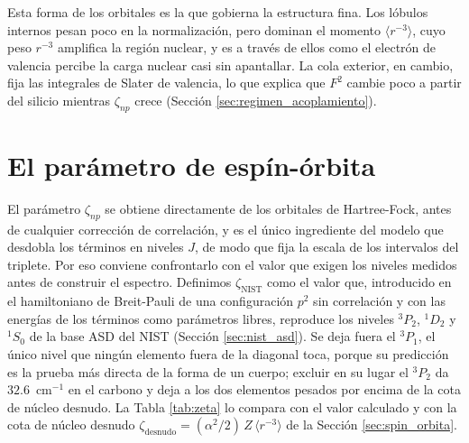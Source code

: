 Esta forma de los orbitales es la que gobierna la estructura fina. Los lóbulos internos pesan poco en la normalización, pero dominan el momento $\langle r^{-3}\rangle$, cuyo peso $r^{-3}$ amplifica la región nuclear, y es a través de ellos como el electrón de valencia percibe la carga nuclear casi sin apantallar. La cola exterior, en cambio, fija las integrales de Slater de valencia, lo que explica que $F^2$ cambie poco a partir del silicio mientras $\zeta_{np}$ crece (Sección \ref{sec:regimen_acoplamiento}).

\section{El parámetro de espín-órbita}
\label{sec:zeta_diagnostico}

El parámetro $\zeta_{np}$ se obtiene directamente de los orbitales de Hartree-Fock, antes de cualquier corrección de correlación, y es el único ingrediente del modelo que desdobla los términos en niveles $J$, de modo que fija la escala de los intervalos del triplete. Por eso conviene confrontarlo con el valor que exigen los niveles medidos antes de construir el espectro. Definimos $\zeta_{\text{NIST}}$ como el valor que, introducido en el hamiltoniano de Breit-Pauli de una configuración $p^2$ sin correlación y con las energías de los términos como parámetros libres, reproduce los niveles $^3P_2$, $^1D_2$ y $^1S_0$ de la base ASD del NIST (Sección \ref{sec:nist_asd}). Se deja fuera el $^3P_1$, el único nivel que ningún elemento fuera de la diagonal toca, porque su predicción es la prueba más directa de la forma de un cuerpo; excluir en su lugar el $^3P_2$ da $32.6$~cm$^{-1}$ en el carbono y deja a los dos elementos pesados por encima de la cota de núcleo desnudo. La Tabla \ref{tab:zeta} lo compara con el valor calculado y con la cota de núcleo desnudo $\zeta_{\text{desnudo}} = (\alpha^2/2)\,Z\,\langle r^{-3}\rangle$ de la Sección \ref{sec:spin_orbita}.

\begin{table}[htbp]
    \centering
    
    \caption[Diagnóstico del parámetro de espín-órbita]{Diagnóstico del parámetro de espín-órbita, en cm$^{-1}$. $\zeta_{\text{desnudo}}$ es el valor que daría el campo nuclear sin apantallar sobre el orbital calculado y $\zeta_{\text{NIST}}$ el que reproduce los niveles medidos. $(\alpha Z)^2$ es la escala de las correcciones relativistas cerca del núcleo.}
    \label{tab:zeta}
\end{table}

